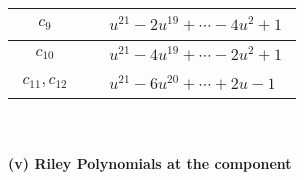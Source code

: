 \documentclass[1p]{elsarticle_modified}
\theoremstyle{definition}
\begin{document}
\begin{tabular}{m{50pt}|m{274pt}}
\hline $$\begin{aligned}c_{9}\end{aligned}$$&$\begin{aligned}
&u^{21}-2 u^{19}+\cdots-4 u^2+1
\end{aligned}$\\
\hline $$\begin{aligned}c_{10}\end{aligned}$$&$\begin{aligned}
&u^{21}-4 u^{19}+\cdots-2 u^2+1
\end{aligned}$\\
\hline $$\begin{aligned}c_{11},c_{12}\end{aligned}$$&$\begin{aligned}
&u^{21}-6 u^{20}+\cdots+2 u-1
\end{aligned}$\\
\hline
\end{tabular}\\~\\
\newpage\renewcommand{\arraystretch}{1}
\flushleft \textbf{(v) Riley Polynomials at the component}\newline \\
\end{document}

